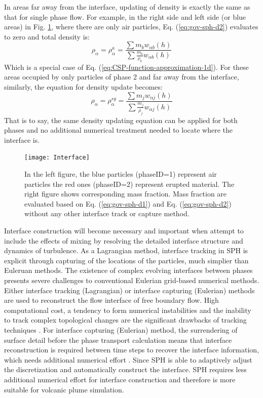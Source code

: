 \documentclass[gmd, manuscript]{copernicus}
\begin{document}
In areas far away from the interface, updating of density is exactly the same as that for single phase flow. For example, in the right side and left side (or blue areas) in Fig. \ref{fig:SPH-multiple-density}, where there are only air particles, Eq.  (\ref{eq:gov-sph-d2}) evaluates to zero and total density is:
\begin{equation}
\rho_{\alpha}=\rho_{\alpha}^a=\frac{\sum m_b w_{\alpha b} \left(h\right)}{\sum \frac{m_b}{\rho_b} w_{\alpha b} \left(h\right)}
\end{equation}
Which is a special case of Eq. (\ref{eq:CSP-function-approximation-1d}). For these areas occupied by only particles of phase 2 and far away from the interface, similarly, the equation for density update becomes: 
\begin{equation}
\rho_{\alpha}=\rho_{\alpha}^{sg}=\frac{\sum m_j w_{\alpha j} \left(h\right)}{\sum \frac{m_j}{\rho_j} w_{\alpha j} \left(h\right)}
\end{equation}
That is to say, the same density updating equation can be applied for both phases and no additional numerical treatment needed to locate where the interface is.

\begin{figure}
\texttt{[image: Interface]}
\caption{In the left figure, the blue particles (phaseID=1) represent air particles the red ones (phaseID=2) represent erupted material. The right figure shows corresponding mass fraction. Mass fraction are evaluated based on Eq. (\ref{eq:gov-sph-d1}) and Eq. (\ref{eq:gov-sph-d2}) without any other interface track or capture method.}
\label{fig:SPH-multiple-density}
\end{figure}

Interface construction will become necessary and important when attempt to include the effects of mixing by resolving the detailed interface structure and dynamics of turbulence. 
As a Lagrangian method, interface tracking in SPH is explicit through capturing of the locations of the particles, much simplier than Euleruan methods.
The existence of complex evolving interfaces between phases presents severe challenges to conventional Eulerian grid-based numerical methods. Either interface tracking (Lagrangian) \citep{harlow1965numerical, wrobel1991computational, cheng1995simplified} or interface capturing (Eulerian) \citep{hirt1981volume, youngs1982time, gerlach2006comparison, gopala2008volume} methods are used to reconstruct the flow interface of free boundary flow. High computational cost, a tendency to form numerical instabilities and the inability to track complex topological changes are the significant drawbacks of tracking techniques \citep{hirt1981volume, unverdi1992front, anderson1998diffuse}. For interface capturing (Eulerian) method, the surrendering of surface detail before the phase transport calculation means that interface reconstruction is required between time steps to recover the interface information, which needs additional numerical effort \citep{hirt1981volume, youngs1982time}.
Since SPH is able to adaptively adjust the discretization and automatically construct the interface. SPH requires less additional numerical effort for interface construction and therefore is more suitable for volcanic plume simulation.
 
\end{document}
